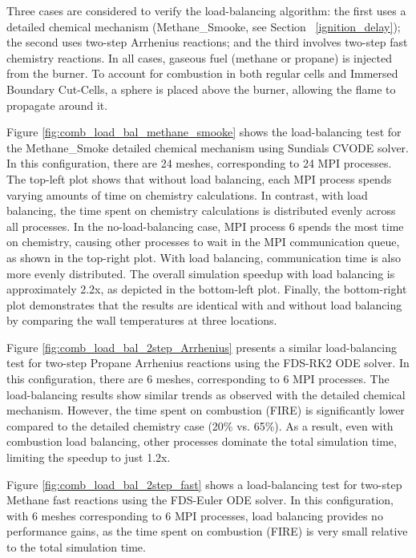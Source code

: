 \documentclass[11pt]{book}
\begin{document}
Three cases are considered to verify the load-balancing algorithm: the first uses a detailed chemical mechanism (Methane\_Smooke, see Section ~\ref{ignition_delay}); the second uses two-step Arrhenius reactions; and the third involves two-step fast chemistry reactions. In all cases, gaseous fuel (methane or propane) is injected from the burner. To account for combustion in both regular cells and Immersed Boundary Cut-Cells, a sphere is placed above the burner, allowing the flame to propagate around it.


Figure \ref{fig:comb_load_bal_methane_smooke} shows the load-balancing test for the Methane\_Smoke detailed chemical mechanism using Sundials CVODE solver. In this configuration, there are 24 meshes, corresponding to 24 MPI processes. The top-left plot shows that without load balancing, each MPI process spends varying amounts of time on chemistry calculations. In contrast, with load balancing, the time spent on chemistry calculations is distributed evenly across all processes. In the no-load-balancing case, MPI process 6 spends the most time on chemistry, causing other processes to wait in the MPI communication queue, as shown in the top-right plot. With load balancing, communication time is also more evenly distributed. The overall simulation speedup with load balancing is approximately 2.2x, as depicted in the bottom-left plot. Finally, the bottom-right plot demonstrates that the results are identical with and without load balancing by comparing the wall temperatures at three locations.

Figure \ref{fig:comb_load_bal_2step_Arrhenius} presents a similar load-balancing test for two-step Propane Arrhenius reactions using the FDS-RK2 ODE solver. In this configuration, there are 6 meshes, corresponding to 6 MPI processes. The load-balancing results show similar trends as observed with the detailed chemical mechanism. However, the time spent on combustion (FIRE) is significantly lower compared to the detailed chemistry case (20\% vs. 65\%). As a result, even with combustion load balancing, other processes dominate the total simulation time, limiting the speedup to just 1.2x.

Figure \ref{fig:comb_load_bal_2step_fast} shows a load-balancing test for two-step Methane fast reactions using the FDS-Euler ODE solver. In this configuration, with 6 meshes corresponding to 6 MPI processes, load balancing provides no performance gains, as the time spent on combustion (FIRE) is very small relative to the total simulation time.
\end{document}
